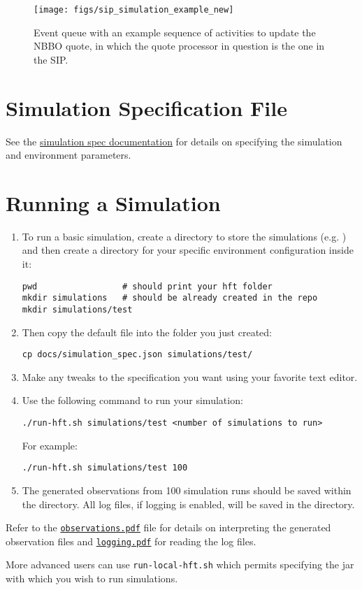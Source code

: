 \documentclass[11pt]{article}
\begin{document}
\begin{figure}
\texttt{[image: figs/sip\_simulation\_example\_new]}
\caption{Event queue with an example sequence of activities to update the NBBO quote, in which the quote processor in question is the one in the SIP.}
\label{fig:sim-sys}
\end{figure}

\section{Simulation Specification File}

See the \href{simulation_spec.pdf}{simulation spec documentation} for details on specifying the simulation and environment parameters.

\section{Running a Simulation}

\begin{enumerate}
\item To run a basic simulation, create a directory to store the
  simulations (e.g. ) and then create a directory for your
  specific environment configuration inside it:
%
\begin{verbatim}
pwd                 # should print your hft folder
mkdir simulations   # should be already created in the repo
mkdir simulations/test
\end{verbatim}

\item Then copy the default  file into the folder you just created:
%
\begin{verbatim}
cp docs/simulation_spec.json simulations/test/
\end{verbatim}

\item Make any tweaks to the specification you want using your favorite text editor.

\item Use the following command to run your simulation:
%
\begin{verbatim}
./run-hft.sh simulations/test <number of simulations to run>
\end{verbatim}

For example:
\begin{verbatim}
./run-hft.sh simulations/test 100
\end{verbatim}

\item The generated observations from 100 simulation runs should be saved within the  directory. All log files, if logging is enabled, will be saved in the  directory.

\end{enumerate}

Refer to the \href{observations.pdf}{\texttt{observations.pdf}} file for details on interpreting the generated observation files and \href{logging.pdf}{\texttt{logging.pdf}} for reading the log files.

More advanced users can use \verb|run-local-hft.sh| which permits specifying the jar with which you wish to run simulations.
\end{document}
